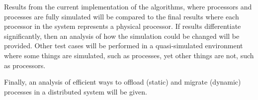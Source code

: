 \documentclass{article}
\begin{document}
Results from the current implementation of the algorithms, where processors
and processes are fully simulated will be compared to the final results
where each processor in the system represents a physical processor.  If
results differentiate significantly, then an analysis of how the simulation
could be changed will be provided.  Other test cases will be performed in a
quasi-simulated environment where some things are simulated, such as
processes, yet other things are not, such as processors.

Finally, an analysis of efficient ways to offload (static) and migrate
(dynamic) processes in a distributed system will be given.





\end{document}

